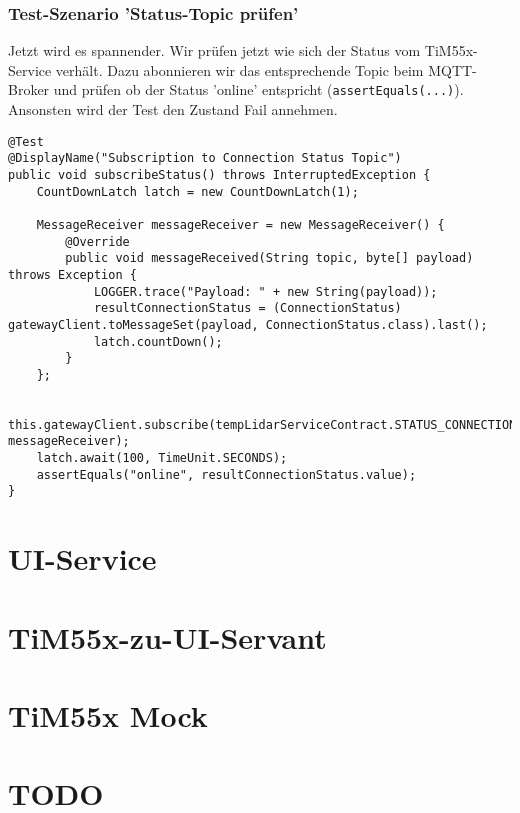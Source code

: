 \subsubsection{Test-Szenario 'Status-Topic prüfen'}
Jetzt wird es spannender. Wir prüfen jetzt wie sich der Status vom TiM55x-Service verhält. Dazu abonnieren wir das entsprechende Topic beim MQTT-Broker und prüfen ob der Status 'online' entspricht (\verb|assertEquals(...)|). Ansonsten wird der Test den Zustand Fail annehmen.
\begin{lstlisting}
@Test
@DisplayName("Subscription to Connection Status Topic")
public void subscribeStatus() throws InterruptedException {
    CountDownLatch latch = new CountDownLatch(1);

    MessageReceiver messageReceiver = new MessageReceiver() {
        @Override
        public void messageReceived(String topic, byte[] payload) throws Exception {
            LOGGER.trace("Payload: " + new String(payload));
            resultConnectionStatus = (ConnectionStatus) gatewayClient.toMessageSet(payload, ConnectionStatus.class).last();
            latch.countDown();
        }
    };

    this.gatewayClient.subscribe(tempLidarServiceContract.STATUS_CONNECTION, messageReceiver);
    latch.await(100, TimeUnit.SECONDS);
    assertEquals("online", resultConnectionStatus.value);
}
\end{lstlisting}

\section{UI-Service}

\section{TiM55x-zu-UI-Servant}
\section{TiM55x Mock}
\label{chap:tim-mock}

\section{TODO}

